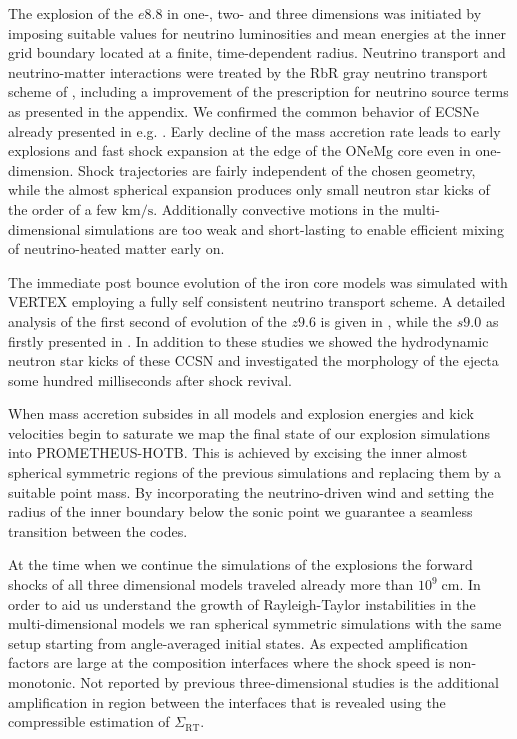 \documentclass[fleqn,usenatbib]{mnras}
\newcommand{\kms}{$\mathrm{km/s}$\xspace}
\newcommand{\prom}{\textsc{P{\footnotesize ROMETHEUS}-H{\footnotesize OT}B}\xspace}
\newcommand{\vertex}{\textsc{V{\footnotesize ERTEX}}\xspace}
\begin{document}
The explosion of the $e8.8$ in one-, two- and three dimensions was initiated by imposing suitable values for neutrino luminosities and mean energies at the inner grid boundary located at a finite, time-dependent radius. Neutrino transport and neutrino-matter interactions were treated by the RbR gray neutrino transport scheme of \citet{Scheck2006}, including a improvement of the prescription for neutrino source terms as presented in the appendix. We confirmed the common behavior of ECSNe already presented in e.g. \citet{Kitaura2006,Gessner2018}. Early decline of the mass accretion rate leads to early explosions and fast shock expansion at the edge of the ONeMg core even in one-dimension. Shock trajectories are fairly independent of the chosen geometry, while the almost spherical expansion produces only small neutron star kicks of the order of a few \kms. Additionally convective motions in the multi-dimensional simulations are too weak and short-lasting to enable efficient mixing of neutrino-heated matter early on.

The immediate post bounce evolution of the iron core models was simulated with \vertex employing a fully self consistent neutrino transport scheme. A detailed analysis of the first second of evolution of the $z9.6$ is given in \citet{Melson2015a}, while the $s9.0$ as firstly presented in \citet{Melson2019}. 
In addition to these studies we showed the hydrodynamic neutron star kicks of these CCSN and investigated the morphology of the ejecta some hundred milliseconds after shock revival. 

When mass accretion subsides in all models and explosion energies and kick velocities begin to saturate we map the final state of our explosion simulations into \prom. This is achieved by excising the inner almost spherical symmetric regions of the previous simulations and replacing them by a suitable point mass. By incorporating the neutrino-driven wind and setting the radius of the inner boundary below the sonic point we guarantee a seamless transition between the codes.

At the time when we continue the simulations of the explosions the forward shocks of all three dimensional models traveled already more than $10^9\;\mathrm{cm}$. 
In order to aid us understand the growth of Rayleigh-Taylor instabilities in the multi-dimensional models we ran spherical symmetric simulations with the same setup starting from angle-averaged initial states. As expected amplification factors are large at the composition interfaces where the shock speed is non-monotonic. Not reported by previous three-dimensional studies is the additional amplification in region between the interfaces that is revealed using the compressible estimation of $\Sigma_{\mathrm{RT}}$.
\end{document}
